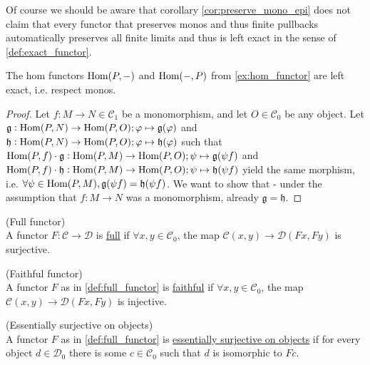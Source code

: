 \begin{remark}
Of course we should be aware that corollary \ref{cor:preserve_mono_epi} does not claim that every functor that preserves
monos and thus finite pullbacks automatically preserves all finite limits and thus is left exact in the sense of \ref{def:exact_functor}.
\end{remark}

\begin{lemma}\label{la:hom_functor_left_exact}
The hom functors $\textup{Hom}(P,-)$ and $\textup{Hom}(-,P)$ from \ref{ex:hom_functor} are left exact, i.e. respect monos.
\begin{proof}
Let $f : M \rightarrow N \in \mathcal{C}_{1}$ be a monomorphism, and let $O \in \mathcal{C}_{0}$ be any object.
Let $\mathfrak{g} : \textup{Hom}(P,N) \rightarrow \textup{Hom}(P,O); \varphi \mapsto \mathfrak{g}(\varphi)$
and $\mathfrak{h} : \textup{Hom}(P,N) \rightarrow \textup{Hom}(P,O); \varphi \mapsto \mathfrak{h}(\varphi)$
such that $\textup{Hom}(P,f) \cdot \mathfrak{g} : \textup{Hom}(P,M) \rightarrow \textup{Hom}(P,O); \psi \mapsto \mathfrak{g}(\psi f)$
and  $\textup{Hom}(P,f) \cdot \mathfrak{h} : \textup{Hom}(P,M) \rightarrow \textup{Hom}(P,O); \psi \mapsto \mathfrak{h}(\psi f)$
yield the same morphism, i.e. $\forall \psi \in \textup{Hom}(P,M), \mathfrak{g}(\psi f) = \mathfrak{h}(\psi f)$.
We want to show that - under the assumption that $f : M \rightarrow N$ was a monomorphism, already $\mathfrak{g} = \mathfrak{h}$.
\end{proof}
\end{lemma}

\begin{definition}{(Full functor)}\label{def:full_functor}\\
A functor $F : \mathcal{C} \rightarrow \mathcal{D}$ is \ul{full} if
$\forall x, y \in \mathcal{C}_{0}$, the map $\mathcal{C}(x, y) \rightarrow \mathcal{D}(Fx, Fy)$ is surjective.
\end{definition}

\begin{definition}{(Faithful functor)}\label{def:faithful_functor}\\
A functor $F$ as in \ref{def:full_functor} is \ul{faithful} if
$\forall x, y \in \mathcal{C}_{0}$, the map $\mathcal{C}(x, y) \rightarrow \mathcal{D}(Fx, Fy)$ is injective.
\end{definition}

\begin{definition}{(Essentially surjective on objects)}\label{def:ess_surj_o_o}\\
A functor $F$ as in \ref{def:full_functor} is \ul{essentially surjective on objects} if for every object $d \in \mathcal{D}_{0}$ there
is some $c \in \mathcal{C}_{0}$ such that $d$ is isomorphic to $Fc$.
\end{definition}

